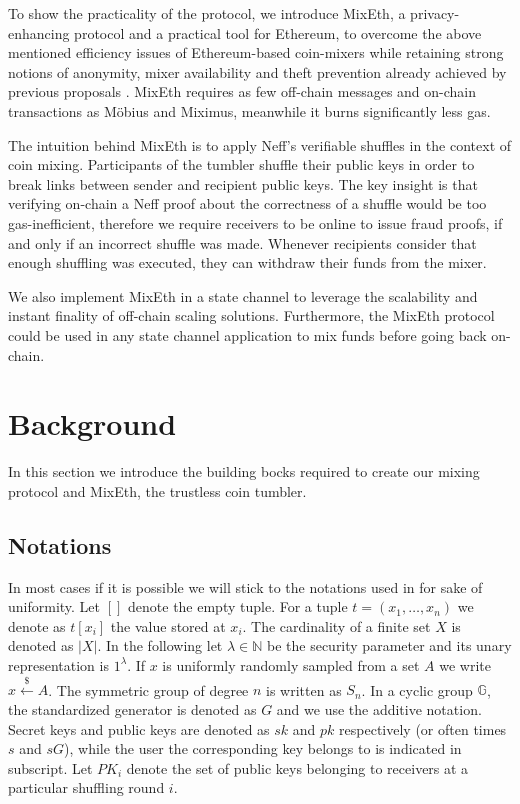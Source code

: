 \documentclass[a4paper]{article}
\theoremstyle{definition}
\begin{document}
To show the practicality of the protocol, we introduce MixEth, a privacy-enhancing protocol and a practical tool for Ethereum, to overcome the above mentioned efficiency issues of Ethereum-based coin-mixers while retaining strong notions of anonymity, mixer availability and theft prevention already achieved by previous proposals \cite{meiklejohn2018mobius,miximus2018}. MixEth requires as few off-chain messages and on-chain transactions as Möbius and Miximus, meanwhile it burns significantly less gas.

The intuition behind MixEth is to apply Neff's verifiable shuffles \cite{neff2001verifiable} in the context of coin mixing. Participants of the tumbler shuffle their public keys in order to break links between sender and recipient public keys. The key insight is that verifying on-chain a Neff proof about the correctness of a shuffle would be too gas-inefficient, therefore we require receivers to be online to issue fraud proofs, if and only if an incorrect shuffle was made. Whenever recipients consider that enough shuffling was executed, they can withdraw their funds from the mixer. 

We also implement MixEth in a state channel to leverage the scalability and instant finality of off-chain scaling solutions. Furthermore, the MixEth protocol could be used in any state channel application to mix funds before going back on-chain. 


\section{Background}
In this section we introduce the building bocks required to create our mixing protocol and MixEth, the trustless coin tumbler.
\subsection{Notations}
In most cases if it is possible we will stick to the notations used in \cite{meiklejohn2018mobius} for sake of uniformity. 
Let $[]$ denote the empty tuple. For a tuple $t=(x_1,\dots,x_n)$ we denote as $t[x_i]$ the value stored at $x_{i}$. The cardinality of a finite set $X$ is denoted as $|X|$. In the following let $\lambda \in \mathbb{N}$ be the security parameter and its unary representation is $1^{\lambda}$. If $x$ is uniformly randomly sampled from a set $A$ we write $x\stackrel{\$}{\leftarrow}A$. The symmetric group of degree $n$ is written as ${S}_n$. In a cyclic group $\mathbb{G}$, the standardized generator is denoted as $G$ and we use the additive notation. Secret keys and public keys are denoted as $sk$ and $pk$ respectively (or often times $s$ and $sG$), while the user the corresponding key belongs to is indicated in subscript. Let $PK_{i}$ denote the set of public keys belonging to receivers at a particular shuffling round $i$.
\end{document}

